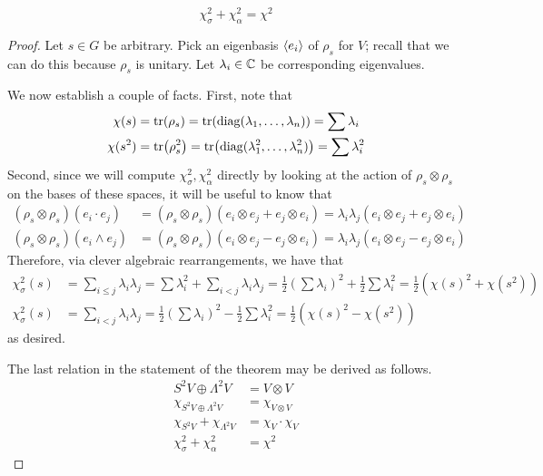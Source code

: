 \documentclass[../notes.tex]{subfiles}
\begin{document}
\begin{itemize}
\begin{proposition}
\begin{equation*}
            \chi_\sigma^2+\chi_\alpha^2 = \chi^2
        \end{equation*}
        \begin{proof}
            Let $s\in G$ be arbitrary. Pick an eigenbasis $\left\langle{e_i}\right\rangle$ of $\rho_s$ for $V$; recall that we can do this because $\rho_s$ is unitary. Let $\lambda_i\in\mathbb{C}$ be corresponding eigenvalues.\par
            We now establish a couple of facts. First, note that
            \begin{align*}
                \chi(s) &= \tr(\rho_s)
                    = \tr(\operatorname{diag}(\lambda_1,\dots,\lambda_n))
                    = \sum\lambda_i\\
                \chi(s^2) &= \tr(\rho_s^2)
                    = \tr(\operatorname{diag}(\lambda_1^2,\dots,\lambda_n^2))
                    = \sum\lambda_i^2
            \end{align*}
            Second, since we will compute $\chi_\sigma^2,\chi_\alpha^2$ directly by looking at the action of $\rho_s\otimes\rho_s$ on the bases of these spaces, it will be useful to know that
            \begin{align*}
                (\rho_s\otimes\rho_s)(e_i\cdot e_j) &= (\rho_s\otimes\rho_s)(e_i\otimes e_j+e_j\otimes e_i)
                    = \lambda_i\lambda_j(e_i\otimes e_j+e_j\otimes e_i)\\
                (\rho_s\otimes\rho_s)(e_i\wedge e_j) &= (\rho_s\otimes\rho_s)(e_i\otimes e_j-e_j\otimes e_i)
                    = \lambda_i\lambda_j(e_i\otimes e_j-e_j\otimes e_i)
            \end{align*}
            Therefore, via clever algebraic rearrangements, we have that
            \begin{align*}
                \chi_\sigma^2(s) &= \sum_{i\leq j}\lambda_i\lambda_j
                    = \sum\lambda_i^2+\sum_{i<j}\lambda_i\lambda_j
                    = \frac{1}{2}\left( \sum\lambda_i \right)^2+\frac{1}{2}\sum\lambda_i^2
                    = \frac{1}{2}(\chi(s)^2+\chi(s^2))\\
                \chi_\sigma^2(s) &= \sum_{i<j}\lambda_i\lambda_j
                    = \frac{1}{2}\left( \sum\lambda_i \right)^2-\frac{1}{2}\sum\lambda_i^2
                    = \frac{1}{2}(\chi(s)^2-\chi(s^2))
            \end{align*}
            as desired.\par
            The last relation in the statement of the theorem may be derived as follows.
            \begin{align*}
                S^2V\oplus\Lambda^2V &= V\otimes V\\
                \chi_{S^2V\oplus\Lambda^2V} &= \chi_{V\otimes V}\\
                \chi_{S^2V}+\chi_{\Lambda^2V} &= \chi_V\cdot\chi_V\\
                \chi_\sigma^2+\chi_\alpha^2 &= \chi^2
            \end{align*}
        \end{proof}
    \end{proposition}
\end{itemize}
\end{document}
